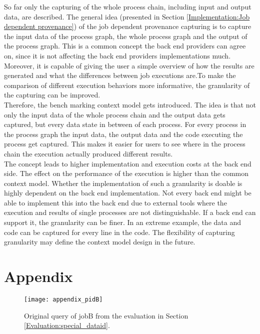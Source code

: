 \documentclass[draft,final]{vutinfth} %
\begin{document}
So far only the capturing of the whole process chain, including input and output data, are described. The general idea (presented in Section \ref{Implementation:Job dependent provenance}) of the job dependent provenance capturing is to capture the input data of the process graph, the whole process graph and the output of the process graph. This is a common concept the back end providers can agree on, since it is not affecting the back end providers implementations much. Moreover, it is capable of giving the user a simple overview of how the results are generated and what the differences between job executions are.To make the comparison of different execution behaviors more informative, the granularity of the capturing can be improved. \\
Therefore, the bench marking context model gets introduced. The idea is that not only the input data of the whole process chain and the output data gets captured, but every data state in between of each process. For every process in the process graph the input data, the output data and the code executing the process get captured. This makes it easier for users to see where in the process chain the execution actually produced different results.\\ The concept leads to higher implementation and execution costs at the back end side. The effect on the performance of the execution is higher than the common context model. Whether the implementation of such a granularity is  doable is highly dependent on the back end implementation. Not every back end might be able to implement this into the back end due to external tools where the execution and results of single processes are not distinguishable. If a back end can support it, the granularity can be finer. In an extreme example, the data and code can be captured for every line in the code. The flexibility of capturing granularity may define the context model design in the future.  

\chapter{Appendix}\label{Appendix}

\begin{figure}[h]
	\centering
	\texttt{[image: appendix\_pidB]}
	\caption{Original query of jobB from the evaluation in Section \ref{Evaluation:special_dataid}.}
	\label{fig:appendix_pidB} %
\end{figure}
\end{document}

